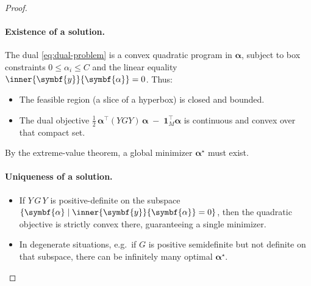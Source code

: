 \begin{proof}
	\paragraph{Existence of a solution.}
	The dual \eqref{eq:dual-problem} is a convex quadratic program in $\symbf{\alpha}$, subject to box constraints $0 \le \alpha_i \le C$ and the linear equality $\inner{\symbf{y}}{\symbf{\alpha}}=0$. Thus:
	\begin{itemize}
		\item The feasible region (a slice of a hyperbox) is closed and bounded.
		\item The dual objective 
		\(
		  \tfrac12\, \symbf{\alpha}^\top (YGY)\,\symbf{\alpha}\;-\;\symbf{1}_M^\top \symbf{\alpha}
		\)
		is continuous and convex over that compact set.
	\end{itemize}
	By the extreme-value theorem, a global minimizer $\symbf{\alpha}^\star$ must exist.
	\paragraph{Uniqueness of a solution.}
	\begin{itemize}
		\item If $Y\,G\,Y$ is positive-definite on the subspace $\{\symbf{\alpha}\mid \inner{\symbf{y}}{\symbf{\alpha}}=0\}$, then the quadratic objective is strictly convex there, guaranteeing a single minimizer.
		\item In degenerate situations, e.g.\ if $G$ is positive semidefinite but not definite on that subspace, there can be infinitely many optimal $\symbf{\alpha}^\star$.
	\end{itemize}
\end{proof}